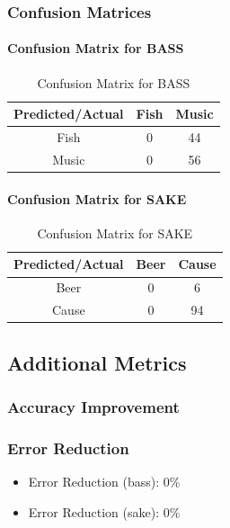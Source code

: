 \documentclass[journal,onecolumn]{IEEEtran}
\begin{document}
\subsubsection{Confusion Matrices}

\paragraph{Confusion Matrix for BASS}
\begin{table}[H]
\caption{Confusion Matrix for BASS}
\centering
\begin{tabular}{|c|c|c|}
\hline
\textbf{Predicted/Actual} & \textbf{Fish} & \textbf{Music} \\ \hline
Fish & 0 & 44 \\ \hline
Music & 0 & 56 \\ \hline
\end{tabular}
\end{table}

\paragraph{Confusion Matrix for SAKE}
\begin{table}[H]
\caption{Confusion Matrix for SAKE}
\centering
\begin{tabular}{|c|c|c|}
\hline
\textbf{Predicted/Actual} & \textbf{Beer} & \textbf{Cause} \\ \hline
Beer & 0 & 6 \\ \hline
Cause & 0 & 94 \\ \hline
\end{tabular}
\end{table}

\subsection{Additional Metrics}
\subsubsection{Accuracy Improvement}

\subsubsection{Error Reduction}
\begin{itemize}
    \item Error Reduction (bass): $0\%$
    \item Error Reduction (sake): $0\%$
\end{itemize}
\end{document}
